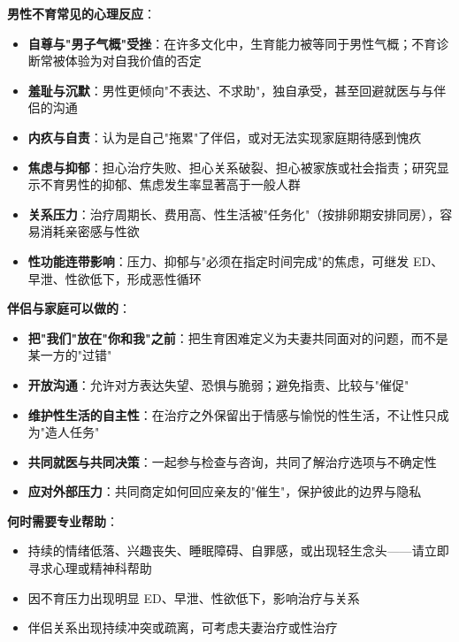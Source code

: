 \documentclass[12pt,a4paper,twoside]{ctexbook}
\begin{document}
\vspace{0.5em}
\noindent\textbf{男性不育常见的心理反应}：

\begin{itemize}[leftmargin=2cm]
	\item \textbf{自尊与"男子气概"受挫}：在许多文化中，生育能力被等同于男性气概；不育诊断常被体验为对自我价值的否定
	\item \textbf{羞耻与沉默}：男性更倾向"不表达、不求助"，独自承受，甚至回避就医与与伴侣的沟通
	\item \textbf{内疚与自责}：认为是自己"拖累"了伴侣，或对无法实现家庭期待感到愧疚
	\item \textbf{焦虑与抑郁}：担心治疗失败、担心关系破裂、担心被家族或社会指责；研究显示不育男性的抑郁、焦虑发生率显著高于一般人群
	\item \textbf{关系压力}：治疗周期长、费用高、性生活被"任务化"（按排卵期安排同房），容易消耗亲密感与性欲
	\item \textbf{性功能连带影响}：压力、抑郁与"必须在指定时间完成"的焦虑，可继发 ED、早泄、性欲低下，形成恶性循环
\end{itemize}

\vspace{0.5em}
\noindent\textbf{伴侣与家庭可以做的}：

\begin{itemize}[leftmargin=2cm]
	\item \textbf{把"我们"放在"你和我"之前}：把生育困难定义为夫妻共同面对的问题，而不是某一方的"过错"
	\item \textbf{开放沟通}：允许对方表达失望、恐惧与脆弱；避免指责、比较与"催促"
	\item \textbf{维护性生活的自主性}：在治疗之外保留出于情感与愉悦的性生活，不让性只成为"造人任务"
	\item \textbf{共同就医与共同决策}：一起参与检查与咨询，共同了解治疗选项与不确定性
	\item \textbf{应对外部压力}：共同商定如何回应亲友的"催生"，保护彼此的边界与隐私
\end{itemize}

\vspace{0.5em}
\noindent\textbf{何时需要专业帮助}：

\begin{itemize}[leftmargin=2cm]
	\item 持续的情绪低落、兴趣丧失、睡眠障碍、自罪感，或出现轻生念头——请立即寻求心理或精神科帮助
	\item 因不育压力出现明显 ED、早泄、性欲低下，影响治疗与关系
	\item 伴侣关系出现持续冲突或疏离，可考虑夫妻治疗或性治疗
\end{itemize}
\end{document}
